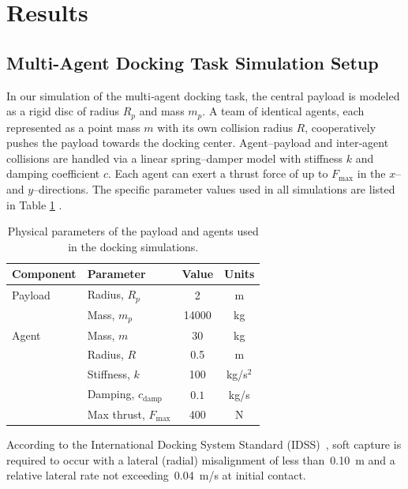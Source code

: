 \section{Results}

\subsection{Multi-Agent Docking Task Simulation Setup}
\label{sec:simsetup}
In our simulation of the multi‐agent docking task, the central payload is modeled as a rigid disc of radius \(R_p\) and mass \(m_p\). A team of identical agents, each represented as a point mass \(m\) with its own collision radius \(R\), cooperatively pushes the payload towards the docking center. Agent–payload and inter‐agent collisions are handled via a linear spring–damper model with stiffness \(k\) and damping coefficient \(c\). Each agent can exert a thrust force of up to \(F_{\max}\) in the \(x\)– and \(y\)–directions. The specific parameter values used in all simulations are listed in Table \ref{tab:physparams} \cite{SpaceXDragon}.

\begin{table}[ht]
  \centering
    \begin{tabular}{llcc}
      \hline
      \textbf{Component} & \textbf{Parameter} & \textbf{Value} & \textbf{Units} \\
      \hline
      Payload            & Radius, \(R_p\)    & 2             & m             \\
                         & Mass,   \(m_p\)    & 14000            & kg            \\
      \hline
      Agent              & Mass,   \(m\)      & 30             & kg            \\
                         & Radius, \(R\)      & 0.5           & m             \\
                         & Stiffness, \(k\)   & 100 & kg/s\(^2\) \\
                         & Damping, \(c_{\text{damp}}\) & \(0.1\) & kg/s \\
                         & Max thrust, \(F_{\max}\) & 400        & N             \\
      \hline
    \end{tabular}
    \caption{Physical parameters of the payload and agents used in the docking simulations.}
  \label{tab:physparams}
\end{table}

According to the International Docking System Standard (IDSS)~\cite{NASA_IDSS_IDD_RevF}, soft capture is required to occur with a lateral (radial) misalignment of less than~0.10~m and a relative lateral rate not exceeding~0.04~m/s at initial contact.

